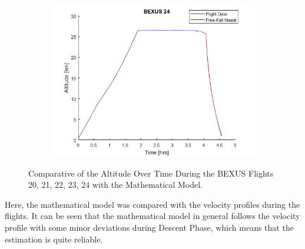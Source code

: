 \begin{figure}[H]
\begin{subfigure}{0.45\textwidth}
    \centering\includegraphics[width=1.1\textwidth]{appendix/img/bexus24mathmodel.png}
  \end{subfigure}
  \caption{Comparative of the Altitude Over Time During the BEXUS Flights 20, 21, 22, 23, 24 with the Mathematical Model.}\label{fig:bexustrajectories}
  \end{figure}
  
 
 
\bigskip
{}

\smallskip
Here, the mathematical model was compared with the velocity profiles during the flights. It can be seen that the mathematical model in general follows the velocity profile with some minor deviations during Descent Phase, which means that the estimation is quite reliable.

